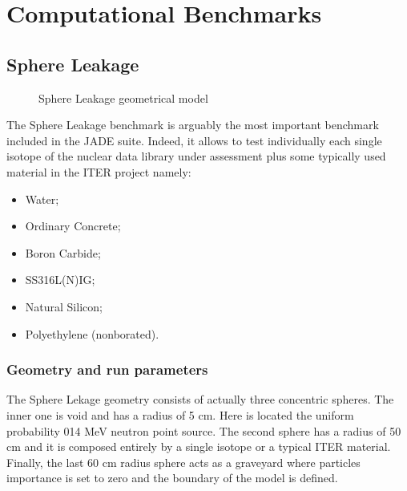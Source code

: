 \documentclass[letterpaper,10pt,english]{sphinxmanual}
\begin{document}
\section{Computational Benchmarks}
\label{\detokenize{usage/benchmarks:computational-benchmarks}}

\subsection{Sphere Leakage}
\label{\detokenize{usage/benchmarks:sphere-leakage}}\label{\detokenize{usage/benchmarks:spheredesc}}
\begin{figure}[htbp]
\centering
\capstart

\noindent{}
\caption{Sphere Leakage geometrical model}\label{\detokenize{usage/benchmarks:id16}}\end{figure}

The Sphere Leakage benchmark is arguably the most important
benchmark included in the JADE suite. Indeed, it allows to test
individually each single isotope of the nuclear data library under assessment
plus some typically used material in the ITER project namely:
\begin{itemize}
\item {} 
Water;

\item {} 
Ordinary Concrete;

\item {} 
Boron Carbide;

\item {} 
SS316L(N)\sphinxhyphen{}IG;

\item {} 
Natural Silicon;

\item {} 
Polyethylene (non\sphinxhyphen{}borated).

\end{itemize}


\subsubsection{Geometry and run parameters}
\label{\detokenize{usage/benchmarks:geometry-and-run-parameters}}
The Sphere Lekage geometry consists of actually three
concentric spheres. The inner one is void and has a radius of 5 cm. Here
is located the uniform probability 0\sphinxhyphen{}14 MeV neutron point source. The second sphere
has a radius of 50 cm and it is composed entirely by a single isotope
or a typical ITER material. Finally,
the last 60 cm radius sphere acts as a graveyard where particles importance is
set to zero and the boundary of the model is defined.
\end{document}
